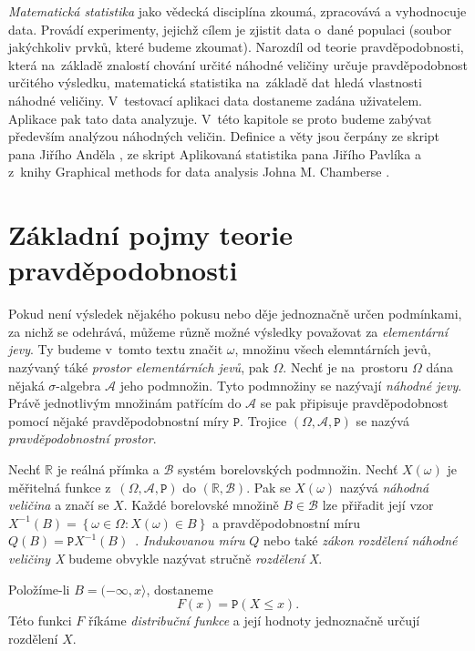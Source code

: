 \documentclass[thesis=B,czech]{FITthesis}[2012/06/26]
\begin{document}
\textit{Matematická statistika} jako vědecká disciplína zkoumá, zpracovává a vyhodnocuje data. Provádí experimenty, jejichž cílem je zjistit data o~dané populaci (soubor jakýchkoliv prvků, které budeme zkoumat). Narozdíl od teorie pravděpodobnosti, která na~základě znalostí chování určité náhodné veličiny určuje pravděpodobnost určitého výsledku, matematická statistika na~základě dat hledá vlastnosti náhodné veličiny. V~testovací aplikaci data dostaneme zadána uživatelem. Aplikace pak tato data analyzuje. V~této kapitole se proto budeme zabývat především analýzou náhodných veličin. Definice a věty jsou čerpány ze skript pana Jiřího Anděla \cite{Anděl}, ze skript Aplikovaná statistika pana Jiřího Pavlíka \cite{VŠCHT} a z~knihy Graphical methods for data analysis Johna M. Chamberse \cite{GraphMethods}.

\section{Základní pojmy teorie pravděpodobnosti}
Pokud není výsledek nějakého pokusu nebo děje jednoznačně určen podmínkami, za nichž se odehrává, můžeme různě možné výsledky považovat za \textit{elementární jevy}. Ty budeme v~tomto textu značit $\omega$, množinu všech elemntárních jevů, nazývaný táké \textit{prostor elementárních jevů}, pak $\Omega$. Nechť je na~prostoru $\Omega$ dána nějaká $\sigma$-algebra $\mathcal{A}$ jeho podmnožin. Tyto podmnožiny se nazývají \textit{náhodné jevy}. Právě jednotlivým množinám patřícím do $\mathcal{A}$ se pak připisuje pravděpodobnost pomocí nějaké pravděpodobnostní míry $\mathtt{P}$. Trojice $(\Omega,\mathcal{A},\mathtt{P})$ se nazývá \textit{pravděpodobnostní prostor}.

Nechť $\mathbb{R}$ je reálná přímka a $\mathcal{B}$ systém borelovských podmnožin. Nechť $X(\omega)$ je měřitelná funkce z~$(\Omega,\mathcal{A},\mathtt{P})$ do $(\mathbb{R},\mathcal{B})$. Pak se $X(\omega)$ nazývá \textit{náhodná veličina} a značí se $X$. Každé borelovské množině $B\in\mathcal{B}$ lze přiřadit její vzor $X^{-1}(B) = \left \{\omega \in \Omega : X(\omega)\in B \right \}$ a pravděpodobnostní míru $Q(B) = \mathtt{P}{X^{-1}(B)}$~\cite{Anděl}. \textit{Indukovanou míru} $Q$ nebo také \textit{zákon rozdělení náhodné veličiny X} budeme obvykle nazývat stručně \textit{rozdělení X}.

Položíme-li $B=(-\infty, x \rangle$, dostaneme 
$$F(x) = \mathtt{P}{(X\leq x)}.$$
Této funkci $F$ říkáme \textit{distribuční funkce} a její hodnoty jednoznačně určují rozdělení $X$.
\end{document}
